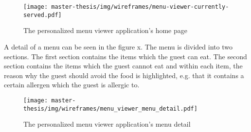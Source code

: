 \begin{figure}[h]
  \centering
  \texttt{[image: master-thesis/img/wireframes/menu-viewer-currently-served.pdf]}
  \caption{The personalized menu viewer application's home page}
\end{figure}

A detail of a menu can be seen in the figure x.
The menu is divided into two sections.
The first section contains the items which the guest can eat.
The second section contains the items which the guest cannot eat and within each item, the reason why the guest should avoid the food is highlighted, e.g. that it contains a certain allergen which the guest is allergic to.

\begin{figure}[h]
  \centering
  \texttt{[image: master-thesis/img/wireframes/menu\_viewer\_menu\_detail.pdf]}
  \caption{The personalized menu viewer application's menu detail}
\end{figure}
